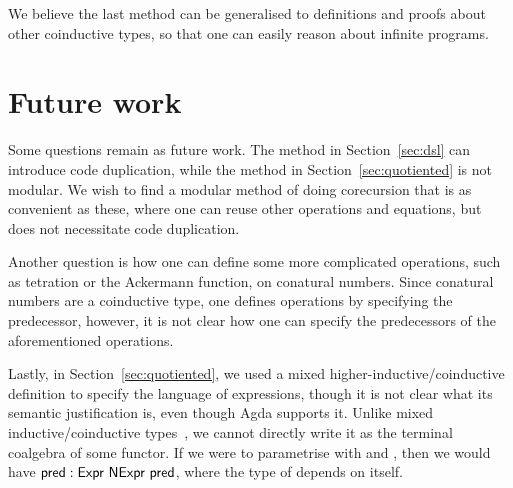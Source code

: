 \documentclass[sigplan, screen, natbib=false, review]{acmart}
\begin{document}
We believe the last method can be generalised to definitions and proofs about
other coinductive types, so that one can easily reason about infinite programs.



\section{Future work}

Some questions remain as future work. The method in Section~\ref{sec:dsl} can
introduce code duplication, while the method in Section~\ref{sec:quotiented} is
not modular. We wish to find a modular method of doing corecursion that is as
convenient as these, where one can reuse other operations and equations, but
does not necessitate code duplication.

Another question is how one can define some more complicated operations, such as
tetration or the Ackermann function, on conatural numbers. Since conatural
numbers are a coinductive type, one defines operations by specifying the
predecessor, however, it is not clear how one can specify the predecessors of
the aforementioned operations.

Lastly, in Section~\ref{sec:quotiented}, we used a mixed
higher-inductive/coinductive definition to specify the language of expressions,
though it is not clear what its semantic justification is, even though Agda
supports it. Unlike mixed inductive/coinductive types~\cite{hancock-stream}, we
cannot directly write it as the terminal coalgebra of some functor. If we were
to parametrise  with  and ,
then we would have $ : \AgdaDatatype{Expr}\ \AgdaRecord{NExpr}\
\AgdaField{pred}$, where the type of \AgdaField{pred} depends on itself.

\printbibliography
\end{document}
